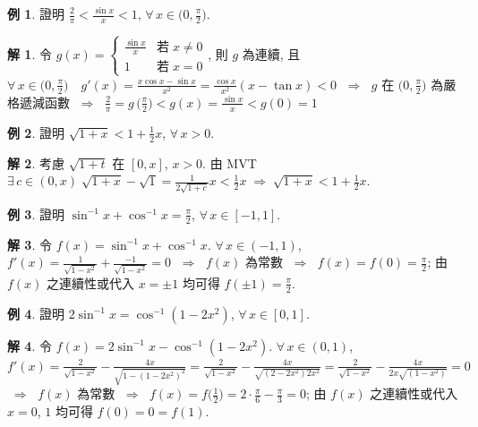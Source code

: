 \documentclass[12pt]{extarticle}
\newcommand{\ds}{\displaystyle}
\newcommand{\ie}{\;\Longrightarrow\;}
\theoremstyle{definition}
\newtheorem*{ex}{例}
\newtheorem*{sol}{解}
\begin{document}
\begin{ex}
  證明 $\ds\frac{2}{\pi} < \frac{\sin x}{x} < 1$, $\ds\forall\,x\in\big(0, \frac{\pi}{2}\big)$. 
\end{ex}

\begin{sol}
  令 $\ds g(x) = \begin{cases}\frac{\sin x}{x} & \text{若}\;x\ne 0 \\ 1 & \text{若}\;x = 0 \end{cases}$, 則 $g$ 為連續, 且 $\ds\forall\,x\in\Big(0,\frac{\pi}{2}\Big)\quad g'(x) = \frac{x\cos x - \sin x}{x^2} = \frac{\cos x}{x^2}(x - \tan x) < 0$ $\ie$ $g$ 在 $\ds\Big(0,\frac{\pi}{2}\Big)$ 為嚴格遞減函數 $\ie$ $\ds\frac{2}{\pi} = g\,\Big(\frac{\pi}{2}\Big) < g(x) = \frac{\sin x}{x} < g(0) = 1$     
\end{sol}

\begin{ex}
  證明 $\ds\sqrt{1 + x} < 1 + \frac{1}{2}x$, $\forall\,x > 0$. 
\end{ex}

\begin{sol}
  考慮 $\ds\sqrt{1 + t}$ 在 $\ds[0, x]$, $\ds x > 0$. 由 MVT $\ds\exists\,c\in(0, x)\;\sqrt{1 + x} - \sqrt{1} = \frac{1}{2\sqrt{1 + c}} x < \frac{1}{2}x \ie \sqrt{1 + x} < 1 + \frac{1}{2}x$. 
\end{sol}

\begin{ex}
  證明 $\ds\sin^{-1}x + \cos^{-1}x = \frac{\pi}{2}$, $\forall\,x\in[-1, 1]$. 
\end{ex}

\begin{sol}
  令 $\ds f(x) = \sin^{-1}x + \cos^{-1}x$. $\forall\,x\in(-1, 1)$, $\ds f'(x) = \frac{1}{\sqrt{1 - x^2}} + \frac{-1}{\sqrt{1 - x^2}} = 0$ $\ie$ $f(x)$ 為常數 $\ie$ $\ds f(x) = f(0) = \frac{\pi}{2}$; 由 $f(x)$ 之連續性或代入 $x = \pm 1$ 均可得 $\ds f(\pm 1) = \frac{\pi}{2}$.    
\end{sol}

\begin{ex}
  證明 $\ds 2\sin^{-1}x = \cos^{-1}(1 - 2x^2)$, $\forall\,x\in[0, 1]$. 
\end{ex}

\begin{sol}
  令 $\ds f(x) = 2\sin^{-1}x - \cos^{-1}(1 - 2x^2)$. $\forall\,x\in(0, 1)$, $\ds f'(x) = \frac{2}{\sqrt{1 - x^2}} - \frac{4x}{\sqrt{1 - (1 - 2x^2)^2}} = \frac{2}{\sqrt{1 - x^2}} - \frac{4x}{\sqrt{(2 - 2x^2)2x^2}} = \frac{2}{\sqrt{1 - x^2}} - \frac{4x}{2x\sqrt{(1 - x^2)}} = 0$ $\ie$ $f(x)$ 為常數 $\ie$ $\ds f(x) = f\Big(\frac{1}{2}\Big) = 2\cdot\frac{\pi}{6} - \frac{\pi}{3} = 0$; 由 $f(x)$ 之連續性或代入 $x = 0$, $1$ 均可得 $f(0) = 0 = f(1)$.   
\end{sol}
\end{document}
